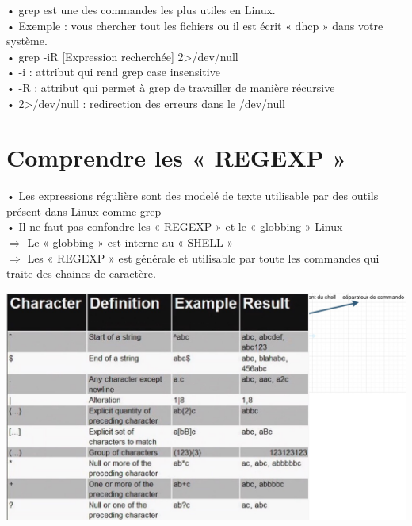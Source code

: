 \documentclass[a4paper, 11pt, french, oneside]{book}
\begin{document}
• grep est une des commandes les plus utiles en Linux.\\
• Exemple : vous chercher tout les fichiers ou il est écrit « dhcp » dans votre système.\\
• grep -iR [Expression recherchée] 2>/dev/null\\
• -i : attribut qui rend grep case insensitive\\
• -R : attribut qui permet à grep de travailler de manière récursive\\
• 2>/dev/null : redirection des erreurs dans le /dev/null\\

\section{\Large Comprendre les « REGEXP »} 

• Les expressions régulière sont des modelé de texte utilisable
par des outils présent dans Linux comme grep\\
• Il ne faut pas confondre les « REGEXP » et le « globbing » Linux\\
$\Rightarrow$ Le « globbing » est interne au « SHELL »\\
$\Rightarrow$ Les « REGEXP » est générale et utilisable par toute les
commandes qui traite des chaines de caractère.\\

\begin{flushleft}
\includegraphics[scale=0.4]{REGEXP.jpg}
\end{flushleft}
\end{document}
